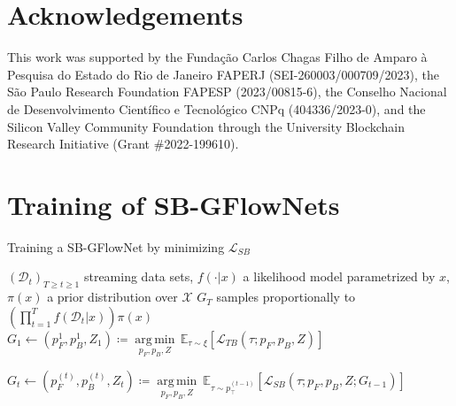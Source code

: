 \documentclass{article}
\DeclareMathOperator*{\argmin}{arg\,min}
\theoremstyle{plain}
\theoremstyle{definition}
\theoremstyle{remark}
\theoremstyle{remark}
\begin{document}
\section*{Acknowledgements}

This work was supported by the Fundação Carlos Chagas Filho de Amparo à Pesquisa do Estado do Rio de Janeiro FAPERJ (SEI-260003/000709/2023), the São Paulo Research Foundation FAPESP (2023/00815-6), the Conselho Nacional de Desenvolvimento Científico e Tecnológico CNPq (404336/2023-0), and the Silicon Valley Community Foundation through the University Blockchain Research Initiative (Grant \#2022-199610).


 
 

\newpage 
\onecolumn 

\appendix

%  

%  

\section{Training of SB-GFlowNets} 

\begin{algorithm}[!t] 
\caption{Training a SB-GFlowNet by minimizing $\mathcal{L}_{SB}$}\label{alg:cap}
\label{alg:training} 
\begin{algorithmic}
\Require $\left(\mathcal{D}_{t}\right)_{T \ge t \ge 1}$ streaming data sets, $f(\cdot | x)$ a likelihood model parametrized by $x$, $\pi(x)$ a prior distribution over $\mathcal{X}$ 
\Ensure $G_{T}$ samples proportionally to $\left( \prod_{t=1}^{T} f(\mathcal{D}_{t} | x) \right) \pi(x)$ 
\State $G_{1} \gets\! (p_{F}^{1}, p_{B}^{1}, Z_{1}) \coloneqq \underset{p_{F}, p_{B}, Z}{\argmin}\, 
\mathbb{E}_{\tau \sim \xi} \left[ \mathcal{L}_{TB}(\tau ; p_{F}, p_{B}, Z)\right]$  

    \State $G_{t} \gets (p_{F}^{(t)}, p_{B}^{(t)}, Z_{t}) \coloneqq\underset{p_{F}, p_{B}, Z}{\argmin} \ \mathbb{E}_{\tau \sim p_{\top}^{(t - 1)}} \left[ \mathcal{L}_{SB}(\tau ; p_{F}, p_{B}, Z; G_{t - 1}) \right]$  
\EndFor 
\end{algorithmic}
\end{algorithm}
\end{document}
